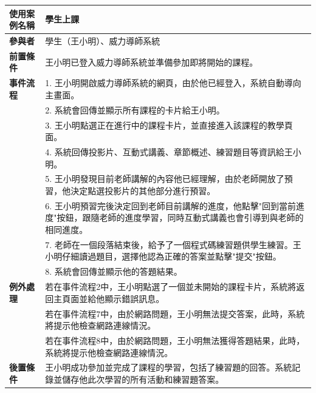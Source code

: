 \documentclass[12pt]{article}
\begin{document}
\begin{longtable}{|l|p{14cm}|}
  \hline
  \textbf{使用案例名稱} & 學生上課 \\ 
  \hline
  \textbf{參與者} & 學生（王小明）、威力導師系統 \\ 
  \hline
  \textbf{前置條件} & 王小明已登入威力導師系統並準備參加即將開始的課程。 \\ 
  \hline
  \textbf{事件流程} 
  & 1. 王小明開啟威力導師系統的網頁，由於他已經登入，系統自動導向主畫面。 \\
  & 2. 系統會回傳並顯示所有課程的卡片給王小明。 \\
  & 3. 王小明點選正在進行中的課程卡片，並直接進入該課程的教學頁面。 \\
  & 4. 系統回傳投影片、互動式講義、章節概述、練習題目等資訊給王小明。 \\
  & 5. 王小明發現目前老師講解的內容他已經理解，由於老師開放了預習，他決定點選投影片的其他部分進行預習。 \\
  & 6. 王小明預習完後決定回到老師目前講解的進度，他點擊"回到當前進度"按鈕，跟隨老師的進度學習，同時互動式講義也會引導到與老師的相同進度。 \\
  & 7. 老師在一個段落結束後，給予了一個程式碼練習題供學生練習。王小明仔細讀過題目，選擇他認為正確的答案並點擊"提交"按鈕。 \\ 
  & 8. 系統會回傳並顯示他的答題結果。 \\
  \hline
  \textbf{例外處理} 
  & 若在事件流程2中，王小明點選了一個並未開始的課程卡片，系統將返回主頁面並給他顯示錯誤訊息。 \\
  & 若在事件流程7中，由於網路問題，王小明無法提交答案，此時，系統將提示他檢查網路連線情況。 \\
  & 若在事件流程8中，由於網路問題，王小明無法獲得答題結果，此時，系統將提示他檢查網路連線情況。 \\
  \hline
  \textbf{後置條件} 
  & 王小明成功參加並完成了課程的學習，包括了練習題的回答。系統記錄並儲存他此次學習的所有活動和練習題答案。 \\
  \hline
\end{longtable}
\end{document}
